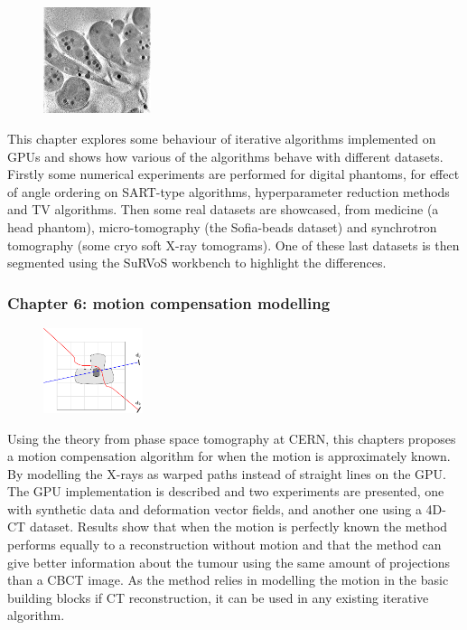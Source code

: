 \begin{figure}
\centering
\includegraphics[width=0.28\textwidth]{Applications/thumnail.png}
\end{figure}

This chapter explores some behaviour of iterative algorithms implemented on GPUs and shows how various of the algorithms behave with different datasets. Firstly some numerical experiments are performed for digital phantoms, for effect of angle ordering  on SART-type algorithms, hyperparameter reduction methods and TV algorithms. Then some real datasets are showcased, from medicine (a head phantom), micro-tomography (the Sofia-beads dataset) and synchrotron tomography (some cryo soft X-ray tomograms). One of these last datasets is then segmented using the SuRVoS workbench to highlight the differences.
\FloatBarrier
\subsubsection{Chapter 6: motion compensation modelling}

\begin{figure}
\centering
\includegraphics[width=0.26\textwidth]{MotionCorrection/diagrammotion1.pdf}
\end{figure}

Using the theory from phase space tomography at CERN, this chapters proposes a motion compensation algorithm for when the motion is approximately known. By modelling the X-rays as warped paths instead of straight lines on the GPU. The GPU implementation is described and two experiments are presented, one with synthetic data and deformation  vector fields, and another one using a 4D-CT dataset. Results show that when the motion is perfectly known the method performs equally to a reconstruction without motion and that the method can give better information about the tumour using the same amount of projections than a CBCT image. As the method relies in modelling the motion in the basic building blocks if CT reconstruction, it can be used in any existing iterative algorithm.
\FloatBarrier
